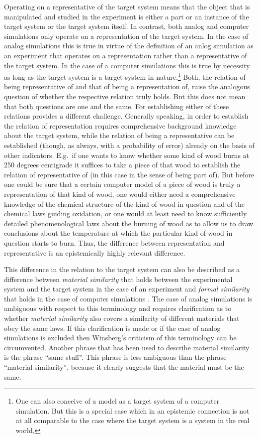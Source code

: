 \documentclass[12pt, a4paper]{article}
\numberwithin{equation}{section}
\begin{document}
Operating on a representative of the target system means that the object that is manipulated and studied in the experiment is either a part or an instance of the target system or the target system itself. In contrast, both analog and computer simulations only operate on a representation of the target system. In the case of analog simulations this is true in virtue of the definition of an anlog simulation as an experiment that operates on a representation rather than a representative of the target system. In the case of a computer simulations this is true by necessity as long as the target system is a target system in nature.\footnote{One can also conceive of a model as a target system of a computer simulation. But this is a special case which in an epistemic connection is not at all comparable to the case where the target system is a system in the real world.} Both, the relation of being representative of and that of being a representation of, raise the analogous question of whether the respective relation truly holds. But this does not mean that both questions are one and the same. For establishing either of these relations provides a different challenge. Generally speaking, in order to establish the relation of representation requires comprehensive background knowledge about the target system, while the relation of being a representative can be established (though, as always, with a probability of error) already on the basis of other indicators. E.g.\ if one wants to know whether some kind of wood burns at 250 degrees centigrade it suffices to take a piece of that wood to establish the relation of representative of (in this case in the sense of being part of). But before one could be sure that a certain computer model of a piece of wood is truly a representation of that kind of wood, one would either need a comprehensive knowledge of the chemical structure of the kind of wood in question and of the chemical laws guiding oxidation, or one would at least need to know sufficiently detailed phenomenological laws about the burning of wood as to allow us to draw conclusions about the temperature at which the particular kind of wood in question starts to burn. Thus, the difference between representation and representative is an epistemically highly relevant difference.

This difference in the relation to the target system can also be described as a difference between {\em material similarity} that holds between the experimental system and the target system in the case of an experiment and {\em formal similarity} that holds in the case of computer simulations \citep{guala:2002}. The case of analog simulations is ambiguous with respect to this terminology and requires clarification as to whether {\em material similarity} also covers a similarity of different materials that obey the same laws. If this clarification is made or if the case of analog simulations is excluded then Winsberg's criticism of this terminology \citep{winsberg:2009} can be circumvented. Another phrase that has been used to describe material similarity is the phrase ``same stuff''. This phrase is less ambiguous than the phrase ``material similarity'', because it clearly suggests that the material must be the same.
\end{document}
